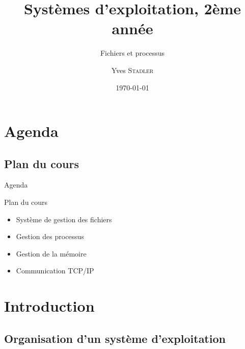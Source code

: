 
\title{Systèmes d'exploitation, 2ème année}
\subtitle{Fichiers et processus}

\author{Yves \textsc{Stadler}}

\date{\today}




\begin{frame}
\titlepage
\end{frame}

\def\sectitle{Agenda}
\section{\sectitle}
\def\subsectitle{Plan du cours}
\subsection{\subsectitle}

\begin{frame}{\sectitle}
\begin{block}{\subsectitle}
\begin{itemize}
\item Système de gestion des fichiers
\item Gestion des processus
\item Gestion de la mémoire
\item Communication TCP/IP
\end{itemize}
\end{block}
\end{frame}

\def\sectitle{Introduction}
\section{\sectitle}
\def\subsectitle{Organisation d'un système d'exploitation}
\subsection{\subsectitle}


